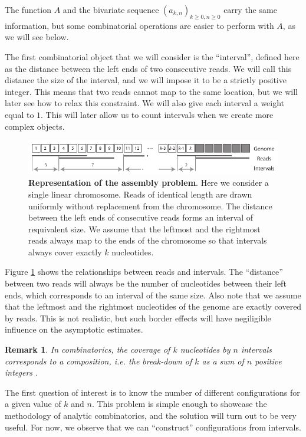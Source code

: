 \documentclass{article}
\newtheorem*{remark}{Remark}
\begin{document}
The function $A$ and the bivariate sequence $(a_{k,n})_{k \geq 0, n \geq
0}$ carry the same information, but some combinatorial operations are
easier to perform with $A$, as we will see below.

The first combinatorial object that we will consider is the ``interval'',
defined here as the distance between the left ends of two consecutive
reads. We will call this distance the size of the interval, and we will
impose it to be a strictly positive integer. This means that two reads
cannot map to the same location, but we will later see how to relax this
constraint. We will also give each interval a weight equal to $1$. This
will later allow us to count intervals when we create more complex
objects.

\begin{figure}[h]
\centering
\includegraphics[scale=0.89]{Fig1.pdf}
\caption{\textbf{Representation of the assembly problem}. Here we consider
a single linear chromosome. Reads of identical length are drawn uniformly
without replacement from the chromosome. The distance between the left
ends of consecutive reads forms an interval of requivalent size. We assume
that the leftmost and the rightmost reads always map to the ends of the
chromosome so that intervals always cover exactly $k$ nucleotides.}
\label{fig:sketchass}
\end{figure}

Figure \ref{fig:sketchass} shows the relationships between reads and
intervals. The ``distance'' between two reads will always be the number of
nucleotides between their left ends, which corresponds to an interval of
the same size. Also note that we assume that the leftmost and the
rightmost nucleotides of the genome are exactly covered by reads. This is
not realistic, but such border effects will have negiligible influence on
the asymptotic estimates.

\begin{remark}
In combinatorics, the coverage of $k$ nucleotides by $n$ intervals
corresponds to a \emph{composition}, \textit{i.e.} the break-down of $k$
as a sum of $n$ positive integers \cite{AnalComb2009}.
\end{remark}

The first question of interest is to know the number of different
configurations for a given value of $k$ and $n$. This problem is simple
enough to showcase the methodology of analytic combinatorics, and the
solution will turn out to be very useful. For now, we observe that we can
``construct'' configurations from intervals.
\end{document}
